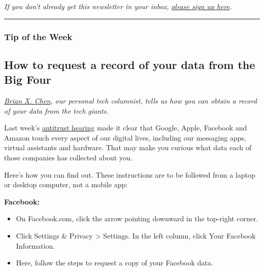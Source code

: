 \emph{If you don't already get this newsletter in your inbox,}
\href{https://www.nytimes.com/newsletters/signup/OT}{\emph{please sign
up here}}\emph{.}

\begin{center}\rule{0.5\linewidth}{\linethickness}\end{center}

\hypertarget{tip-of-the-week}{%
\subsubsection{Tip of the Week}\label{tip-of-the-week}}

\hypertarget{how-to-request-a-record-of-your-data-from-the-big-four}{%
\subsection{How to request a record of your data from the Big
Four}\label{how-to-request-a-record-of-your-data-from-the-big-four}}

\href{https://www.nytimes.com/by/brian-x-chen}{\emph{Brian X.
Chen}}\emph{, our personal tech columnist, tells us how you can obtain a
record of your data from the tech giants.}

Last week's
\href{https://www.nytimes.com/2020/07/29/technology/big-tech-hearing-apple-amazon-facebook-google.html}{antitrust
hearing} made it clear that Google, Apple, Facebook and Amazon touch
every aspect of our digital lives, including our messaging apps, virtual
assistants and hardware. That may make you curious what data each of
those companies has collected about you.

Here's how you can find out. These instructions are to be followed from
a laptop or desktop computer, not a mobile app:

\textbf{Facebook:}

\begin{itemize}
\tightlist
\item
  On Facebook.com, click the arrow pointing downward in the top-right
  corner.
\end{itemize}

\begin{itemize}
\tightlist
\item
  Click Settings \& Privacy \textgreater{} Settings. In the left column,
  click Your Facebook Information.
\end{itemize}

\begin{itemize}
\tightlist
\item
  Here, follow the steps to request a copy of your Facebook data.
\end{itemize}

